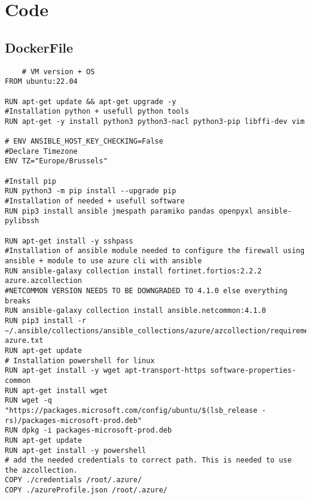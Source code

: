 \documentclass[dutch,dit,thesis]{hogentreport}
\begin{document}





%
%




\appendix

\chapter{Code}

\section{DockerFile}
\label{code:DockerFile}
\begin{lstlisting}
    # VM version + OS
FROM ubuntu:22.04

RUN apt-get update && apt-get upgrade -y
#Installation python + usefull python tools
RUN apt-get -y install python3 python3-nacl python3-pip libffi-dev vim

# ENV ANSIBLE_HOST_KEY_CHECKING=False
#Declare Timezone
ENV TZ="Europe/Brussels"

#Install pip 
RUN python3 -m pip install --upgrade pip
#Installation of needed + usefull software
RUN pip3 install ansible jmespath paramiko pandas openpyxl ansible-pylibssh

RUN apt-get install -y sshpass
#Installation of ansible module needed to configure the firewall using ansible + module to use azure cli with ansible
RUN ansible-galaxy collection install fortinet.fortios:2.2.2 azure.azcollection
#NETCOMMON VERSION NEEDS TO BE DOWNGRADED TO 4.1.0 else everything breaks
RUN ansible-galaxy collection install ansible.netcommon:4.1.0 
RUN pip3 install -r ~/.ansible/collections/ansible_collections/azure/azcollection/requirements-azure.txt
RUN apt-get update
# Installation powershell for linux
RUN apt-get install -y wget apt-transport-https software-properties-common
RUN apt-get install wget
RUN wget -q "https://packages.microsoft.com/config/ubuntu/$(lsb_release -rs)/packages-microsoft-prod.deb"
RUN dpkg -i packages-microsoft-prod.deb
RUN apt-get update
RUN apt-get install -y powershell
# add the needed credentials to correct path. This is needed to use the azcollection.
COPY ./credentials /root/.azure/
COPY ./azureProfile.json /root/.azure/
\end{lstlisting}
\end{document}
